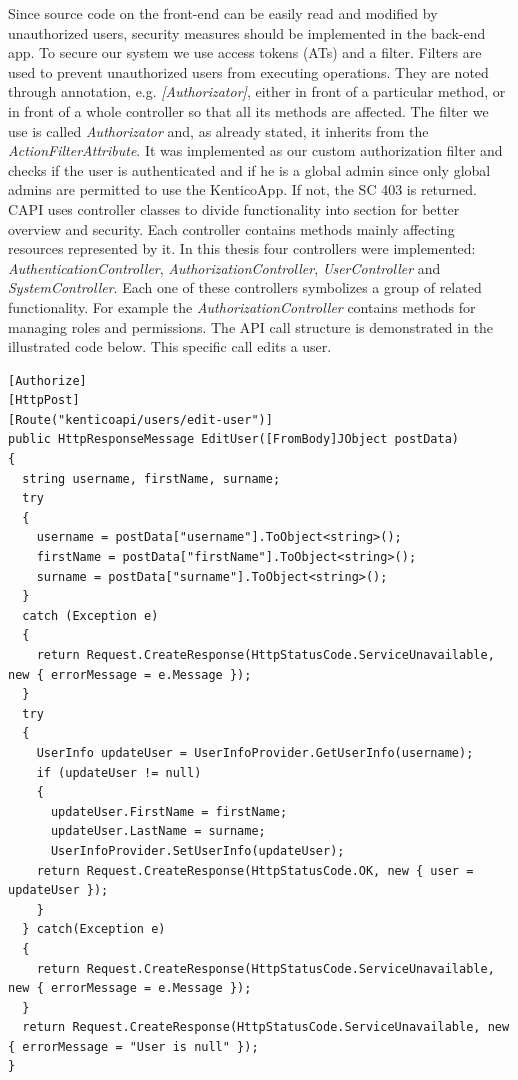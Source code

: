 Since source code on the front-end can be easily read and modified by unauthorized users, security measures should be implemented in the back-end app. To secure our system we use access tokens (ATs) and a filter. Filters are used to prevent unauthorized users from executing operations. They are noted through annotation, e.g. \textit{[Authorizator]}, either in front of a particular method, or in front of a whole controller so that all its methods are affected. The filter we use is called \textit{Authorizator} and, as already stated, it inherits from the \textit{ActionFilterAttribute}. It was implemented as our custom authorization filter and checks if the user is authenticated and if he is a global admin since only global admins are permitted to use the KenticoApp. If not, the SC 403 is returned.
CAPI uses controller classes to divide functionality into section for better overview and security. Each controller contains methods mainly affecting resources represented by it. In this thesis four controllers were implemented: \textit{AuthenticationController}, \textit{AuthorizationController}, \textit{UserController} and \textit{SystemController}. Each one of these controllers symbolizes a group of related functionality. For example the \textit{AuthorizationController} contains methods for managing roles and permissions. 
The API call structure is demonstrated in the illustrated code below. This specific call edits a user.
\lstset{style=sharpc, numbers=left}
\begin{lstlisting}
[Authorize]
[HttpPost]
[Route("kenticoapi/users/edit-user")]
public HttpResponseMessage EditUser([FromBody]JObject postData)
{
  string username, firstName, surname;
  try
  {
    username = postData["username"].ToObject<string>();
    firstName = postData["firstName"].ToObject<string>(); 
    surname = postData["surname"].ToObject<string>();
  }
  catch (Exception e)
  {
    return Request.CreateResponse(HttpStatusCode.ServiceUnavailable, new { errorMessage = e.Message });
  }
  try
  {
    UserInfo updateUser = UserInfoProvider.GetUserInfo(username);
    if (updateUser != null)
    {
      updateUser.FirstName = firstName;
      updateUser.LastName = surname;
      UserInfoProvider.SetUserInfo(updateUser);
    return Request.CreateResponse(HttpStatusCode.OK, new { user = updateUser });
    }
  } catch(Exception e)
  {
    return Request.CreateResponse(HttpStatusCode.ServiceUnavailable, new { errorMessage = e.Message });
  }
  return Request.CreateResponse(HttpStatusCode.ServiceUnavailable, new { errorMessage = "User is null" });
}
\end{lstlisting}
